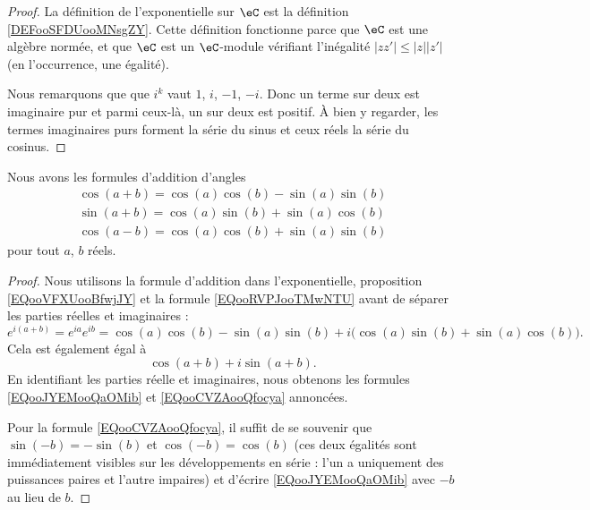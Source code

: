 \begin{proof}
    La définition de l'exponentielle sur \( \eC\) est la définition \ref{DEFooSFDUooMNsgZY}. Cette définition fonctionne parce que \( \eC\) est une algèbre normée, et que \( \eC\) est un \( \eC\)-module vérifiant l'inégalité \(  | zz' |\leq | z | |z' | \) (en l'occurrence, une égalité).

    Nous remarquons que que \( i^k\) vaut \( 1\), \( i\), \( -1\), \( -i\). Donc un terme sur deux est imaginaire pur et parmi ceux-là, un sur deux est positif. À bien y regarder, les termes imaginaires purs forment la série du sinus et ceux réels la série du cosinus.
\end{proof}

\begin{lemma}       \label{LEMooJAWBooJGfZIL}
    Nous avons les formules d'addition d'angles
    \begin{subequations}        \label{SUBEQSooFSSMooHcYwRc}
        \begin{align}
            \cos(a+b)=\cos(a)\cos(b)-\sin(a)\sin(b) \label{EQooJYEMooQaOMib}\\
            \sin(a+b)=\cos(a)\sin(b)+\sin(a)\cos(b) \label{EQooECAUooQzckDv}\\
            \cos(a-b)=\cos(a)\cos(b)+\sin(a)\sin(b) \label{EQooCVZAooQfocya}
        \end{align}
    \end{subequations}
    pour tout \( a\), \( b\) réels.
\end{lemma}  

\begin{proof}
    Nous utilisons la formule d'addition dans l'exponentielle, proposition \eqref{EQooVFXUooBfwjJY} et la formule \eqref{EQooRVPJooTMwNTU} avant de séparer les parties réelles et imaginaires :
    \begin{equation}
        e^{i(a+b)}= e^{ia} e^{ib}=\cos(a)\cos(b)-\sin(a)\sin(b)+i\big( \cos(a)\sin(b)+\sin(a)\cos(b) \big).
    \end{equation}
    Cela est également égal à
    \begin{equation}
        \cos(a+b)+i\sin(a+b).
    \end{equation}
    En identifiant les parties réelle et imaginaires, nous obtenons les formules \eqref{EQooJYEMooQaOMib} et \eqref{EQooCVZAooQfocya} annoncées. 

    Pour la formule \eqref{EQooCVZAooQfocya}, il suffit de se souvenir que \( \sin(-b)=-\sin(b)\) et \( \cos(-b)=\cos(b)\) (ces deux égalités sont immédiatement visibles sur les développements en série : l'un a uniquement des puissances paires et l'autre impaires) et d'écrire \eqref{EQooJYEMooQaOMib} avec \( -b\) au lieu de \( b\).
\end{proof}

